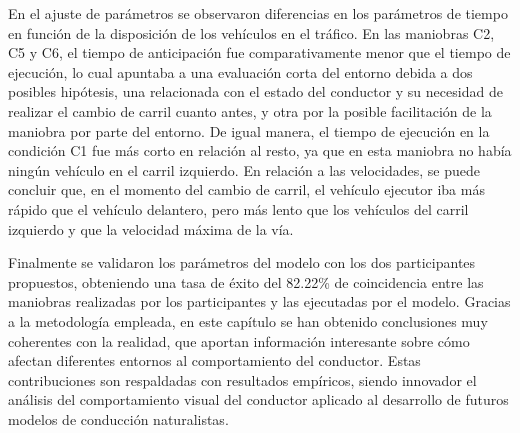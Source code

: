 En el ajuste de parámetros se observaron diferencias en los parámetros de tiempo en función de la disposición de los vehículos en el tráfico. En las maniobras C2, C5 y C6, el tiempo de anticipación fue comparativamente menor que el tiempo de ejecución, lo cual apuntaba a una evaluación corta del entorno debida a dos posibles hipótesis, una relacionada con el estado del conductor y su necesidad de realizar el cambio de carril cuanto antes, y otra por la posible facilitación de la maniobra por parte del entorno. De igual manera, el tiempo de ejecución en la condición C1 fue más corto en relación al resto, ya que en esta maniobra no había ningún vehículo en el carril izquierdo. En relación a las velocidades, se puede concluir que, en el momento del cambio de carril, el vehículo ejecutor iba más rápido que el vehículo delantero, pero más lento que los vehículos del carril izquierdo y que la velocidad máxima de la vía. 

Finalmente se validaron los parámetros del modelo con los dos participantes propuestos, obteniendo una tasa de éxito del 82.22\% de coincidencia entre las maniobras realizadas por los participantes y las ejecutadas por el modelo. Gracias a la metodología empleada, en este capítulo se han obtenido conclusiones muy coherentes con la realidad, que aportan información interesante sobre cómo afectan diferentes entornos al comportamiento del conductor. Estas contribuciones son respaldadas con resultados empíricos, siendo innovador el análisis del comportamiento visual del conductor aplicado al desarrollo de futuros modelos de conducción naturalistas. 
